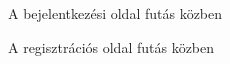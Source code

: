 \begin{figure}[h]
\centering
{}
\caption{A bejelentkezési oldal futás közben}
\label{fig:loginTest}
\end{figure}

\begin{figure}[h]
\centering
{}
\caption{A regisztrációs oldal futás közben}
\label{fig:registerTest}
\end{figure}

